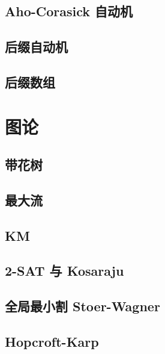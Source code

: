 \documentclass[10pt]{article}
\begin{document}
		\subsection{Aho-Corasick 自动机}
		

	\subsection{后缀自动机}
		

	\subsection{后缀数组}
		

\section{图论}
	\subsection{带花树}
		

	\subsection{最大流}
		
	
	\subsection{KM}
		

	\subsection{2-SAT 与 Kosaraju}
		

	\subsection{全局最小割 Stoer-Wagner}
		

	\subsection{Hopcroft-Karp}
		
\end{document}
